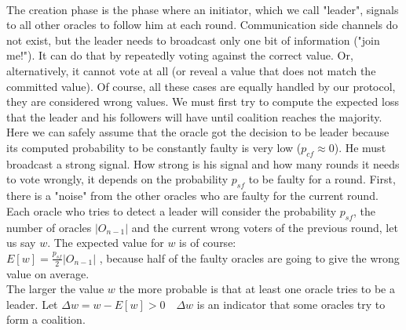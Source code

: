 \documentclass{article}
\begin{document}
\paragraph{ }
The creation phase is the phase where an initiator, which we call "leader", signals to all other oracles to follow him at each round. Communication side channels do not exist, but the leader needs to broadcast only one bit of information ("join me!"). It can do that by repeatedly voting against the correct value. Or, alternatively, it cannot vote at all (or reveal a value that does not match the committed value). Of course, all these cases are equally handled by our protocol, they are considered wrong values.
We must first try to compute the expected loss that the leader and his followers will have until coalition reaches the majority. Here we can safely assume that the oracle got the decision to be leader because its computed probability to be constantly faulty is very low ($p_{cf}\approx0$). He must broadcast a strong signal. How strong is his signal and how many rounds it needs to vote wrongly, it depends on the probability $p_{sf}$ to be faulty for a round. First, there is a "noise" from the other oracles who are faulty for the current round. Each oracle who tries to detect a leader will consider the probability $p_{sf}$, the number of oracles $|O_{n-1}|$ and the current wrong voters of the previous round, let us say $w$. The expected value for $w$ is of course:\\
$E[w]= \frac{p_{sf}}{2}|O_{n-1}|$ , because half of the faulty oracles are going to give the wrong value on average.\\
The larger the value $w$ the more probable is that at least one oracle tries to be a leader. Let $\Delta w=w-E[w]>0$~~$\Delta w$ is an indicator that some oracles try to form a coalition.\\
\end{document}
